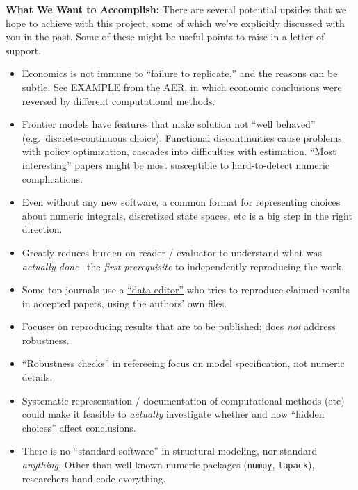 \documentclass[12pt,pdftex,letterpaper]{article}
\begin{document}
\noindent \textbf{What We Want to Accomplish:} There are several potential upsides that we hope to achieve with this project, some of which we've explicitly discussed with you in the past. Some of these might be useful points to raise in a letter of support.
\begin{itemize}
	\item Economics is not immune to ``failure to replicate,'' and the reasons can be subtle. See EXAMPLE from the AER, in which economic conclusions were reversed by different computational methods.
	
	\item Frontier models have features that make solution not ``well behaved'' (e.g.\ discrete-continuous choice). Functional discontinuities cause problems with policy optimization, cascades into difficulties with estimation. ``Most interesting'' papers might be most susceptible to hard-to-detect numeric complications.
	
	\item Even without any new software, a common format for representing choices about numeric integrals, discretized state spaces, etc is a big step in the right direction.
	
	\item Greatly reduces burden on reader / evaluator to understand what was \textit{actually done}-- the \textit{first prerequisite} to independently reproducing the work.
	
	\item Some top journals use a \href{https://www.econometricsociety.org/publications/es-data-editor-website}{``data editor''} who tries to reproduce claimed results in accepted papers, using the authors' own files.
	
	\item Focuses on reproducing results that are to be published; does \textit{not} address robustness.
	
	\item ``Robustness checks'' in refereeing focus on model specification, not numeric details.
	
	\item Systematic representation / documentation of computational methods (etc) could make it feasible to \textit{actually} investigate whether and how ``hidden choices'' affect conclusions.
	
	\item There is no ``standard software'' in structural modeling, nor standard \textit{anything}. Other than well known numeric packages (\texttt{numpy}, \texttt{lapack}), researchers hand code everything.
	

\end{itemize}
\end{document}

